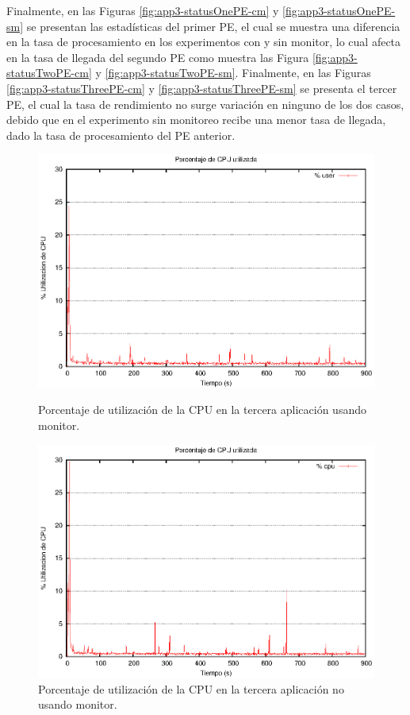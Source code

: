 Finalmente, en las Figuras \ref{fig:app3-statusOnePE-cm} y \ref{fig:app3-statusOnePE-sm} se presentan las estadísticas del primer PE, el cual se muestra una diferencia en la tasa de procesamiento en los experimentos con y sin monitor, lo cual afecta en la tasa de llegada del segundo PE como muestra las Figura \ref{fig:app3-statusTwoPE-cm} y \ref{fig:app3-statusTwoPE-sm}. Finalmente, en las Figuras \ref{fig:app3-statusThreePE-cm} y \ref{fig:app3-statusThreePE-sm} se presenta el tercer PE, el cual la tasa de rendimiento no surge variación en ninguno de los dos casos, debido que en el experimento sin monitoreo recibe una menor tasa de llegada, dado la tasa de procesamiento del PE anterior.

\begin{figure}[!hptb]
\centering

\begin{minipage}[c]{0.45\textwidth}
\centering
    \includegraphics[width=\textwidth]{images/exp/app3/cm/fisical/consumeCPU.eps}
    \caption{Porcentaje de utilización de la CPU en la tercera aplicación usando monitor.}
    \label{fig:app3-consumeCPU-cm}
\end{minipage} \hspace*{1cm}
\begin{minipage}[c]{0.45\textwidth}
\centering
    \includegraphics[width=\textwidth]{images/exp/app3/sm/fisical/consumeCPU.eps}
    \caption{Porcentaje de utilización de la CPU en la tercera aplicación no usando monitor.}
    \label{fig:app3-consumeCPU-sm}
\end{minipage}


\end{figure}
